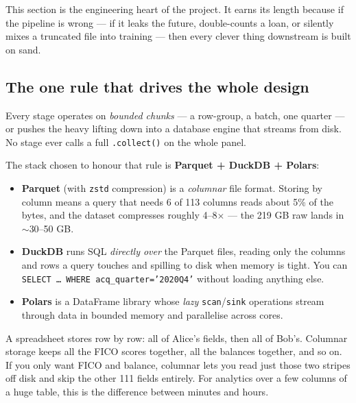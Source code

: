 \documentclass[11pt]{article}
\begin{document}
This section is the engineering heart of the project. It earns its length because if the
pipeline is wrong --- if it leaks the future, double-counts a loan, or silently mixes a
truncated file into training --- then every clever thing downstream is built on sand.

\subsection{The one rule that drives the whole design}

\begin{keyidea}
Every stage operates on \emph{bounded chunks} --- a row-group, a batch, one quarter ---
or pushes the heavy lifting down into a database engine that streams from disk. No stage
ever calls a full \texttt{.collect()} on the whole panel.
\end{keyidea}

The stack chosen to honour that rule is \textbf{Parquet + DuckDB + Polars}:

\begin{itemize}[leftmargin=1.4em, itemsep=2pt]
  \item \textbf{Parquet} (with \texttt{zstd} compression) is a \emph{columnar} file
        format. Storing by column means a query that needs 6 of 113 columns reads about
        5\% of the bytes, and the dataset compresses roughly 4--8$\times$ --- the 219 GB
        raw lands in $\sim$30--50 GB.
  \item \textbf{DuckDB} runs SQL \emph{directly over} the Parquet files, reading only the
        columns and rows a query touches and spilling to disk when memory is tight. You
        can \texttt{SELECT \dots\ WHERE acq\_quarter='2020Q4'} without loading anything
        else.
  \item \textbf{Polars} is a DataFrame library whose \emph{lazy} \texttt{scan}/\texttt{sink}
        operations stream through data in bounded memory and parallelise across cores.
\end{itemize}

\begin{jargon}
A spreadsheet stores row by row: all of Alice's fields, then all of Bob's. Columnar
storage keeps all the FICO scores together, all the balances together, and so on. If you
only want FICO and balance, columnar lets you read just those two stripes off disk and
skip the other 111 fields entirely. For analytics over a few columns of a huge table,
this is the difference between minutes and hours.
\end{jargon}
\end{document}
